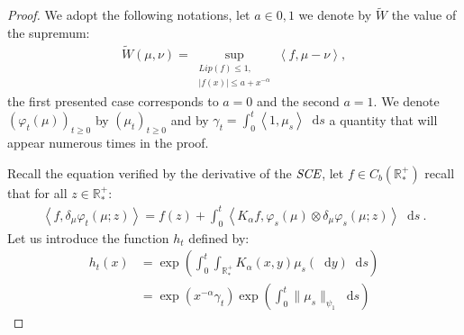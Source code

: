\documentclass[11pt,a4paper]{article}
\newcommand{\RRP}{\mathbb{R}^+_*}
\newcommand{\SCE}{\emph{SCE}}
\newcommand{\Proc}[1]{\left(#1\right)_{t\geq 0}}
\newcommand{\brac}[1]{\left\langle#1\right\rangle}
\newcommand{\dd}{\mathop{}\!\mathrm{d}}
\begin{document}
\begin{proof}
    We adopt the following notations, let $a \in {0,1}$ we denote by $\tilde{W}$ the value of the supremum:
    \begin{align*}
        \tilde{W}(\mu,\nu) = \sup\limits_{\substack{Lip(f) \leq 1, \\|f(x)| \leq a + x^{-\alpha}}} \brac{f,\mu-\nu},
    \end{align*}
    the first presented case corresponds to $a = 0$ and the second $a = 1$. We denote $\Proc{\varphi_t(\mu)}$ by $\Proc{\mu_t}$ and by $\gamma_t = \int_0^t \brac{1,\mu_s} \dd s$ a quantity that will appear numerous times in the proof.

    Recall the equation verified by the derivative of the $\SCE$, let $f\in C_b(\RRP)$ recall that for all $z \in \RRP$:
    \begin{align*}
        \brac{f,\delta_\mu\varphi_t(\mu;z)} = f(z) + \int_0^t \brac{K_\alpha f, \varphi_s(\mu)\otimes\delta_\mu\varphi_s(\mu;z)} \dd s\ .
    \end{align*}
    Let us introduce the function $h_t$ defined by:
    \begin{align*}
        h_t(x) &= \exp\left(\int_0^t \int_{\RRP}K_\alpha(x,y)\mu_s(\dd y) \dd s\right)\\
        &= \exp\left(x^{-\alpha}\gamma_t\right)\exp\left( {\int_0^t\|\mu_s\|_{\psi_1}\dd s}\right)  
    \end{align*}


\end{proof}
\end{document}
